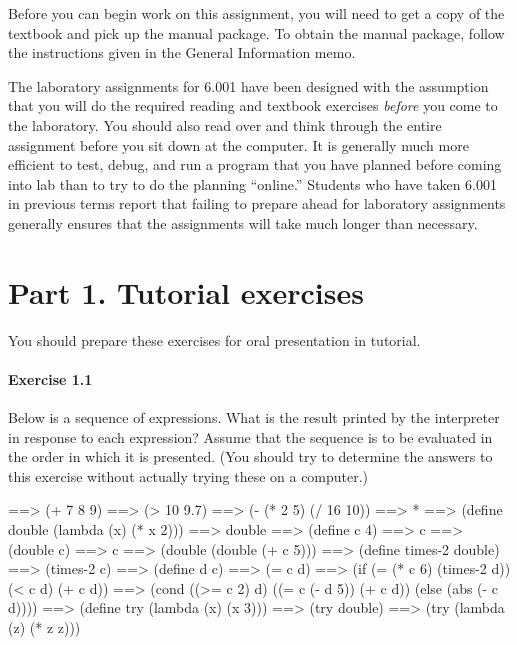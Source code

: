 Before you can begin work on this assignment, you will need to get a
copy of the textbook and pick up the manual package.  To obtain the
manual package, follow the instructions given in the General
Information memo.

The laboratory assignments for 6.001 have been designed with the
assumption that you will do the required reading and textbook
exercises {\em before} you come to the laboratory.  You should also
read over and think through the entire assignment before you sit down
at the computer.  It is generally much more efficient to test, debug,
and run a program that you have planned before coming into lab than to
try to do the planning ``online.'' Students who have taken 6.001 in
previous terms report that failing to prepare ahead for laboratory
assignments generally ensures that the assignments will take much
longer than necessary.

\pagebreak

\section{Part 1. Tutorial exercises}

You should prepare these exercises for oral presentation in tutorial.

\paragraph{Exercise 1.1}
Below is a sequence of expressions.  What is the result printed by the
interpreter in response to each expression?  Assume that the sequence
is to be evaluated in the order in which it is presented.  (You should
try to determine the answers to this exercise without actually trying
these on a computer.)

\beginlisp
==> (+ 7 8 9)
\null
==> (> 10 9.7)
\null
==> (- (* 2 5) (/ 16 10))
\null
==> *
\null
==> (define double (lambda (x) (* x 2)))
\null
==> double
\null
==> (define c 4)
\null
==> c
\null
==> (double c)
\null
==> c
\null
==> (double (double (+ c 5)))
\null
==> (define times-2 double)
\null
==> (times-2 c)
\null
==> (define d c)
\null
==> (= c d)
\null
==> (if (= (* c 6) (times-2 d))
        (< c d)
        (+ c d))
\null
==> (cond ((>= c 2) d)
          ((= c (- d 5)) (+ c d))
          (else (abs (- c d))))
\null
==> (define try (lambda (x) (x 3)))
\null
==> (try double)
\null
==> (try (lambda (z) (* z z)))
\endlisp


